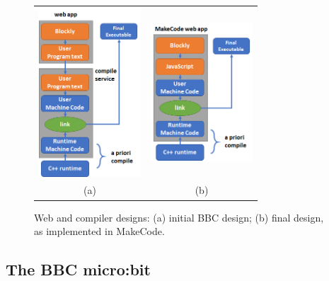 \begin{figure} 
    \begin{tabular}{cc}
      \includegraphics[width=1.5in]{images/bbc.png} & \includegraphics[width=1.5in]{images/makecode.png} \\
        (a) & (b) 
    \end{tabular}
    \caption{\label{fig:design}Web and compiler designs: (a) initial BBC design; (b) final design, as implemented in MakeCode.}
    \end{figure}

    
\subsection{The BBC micro:bit}

